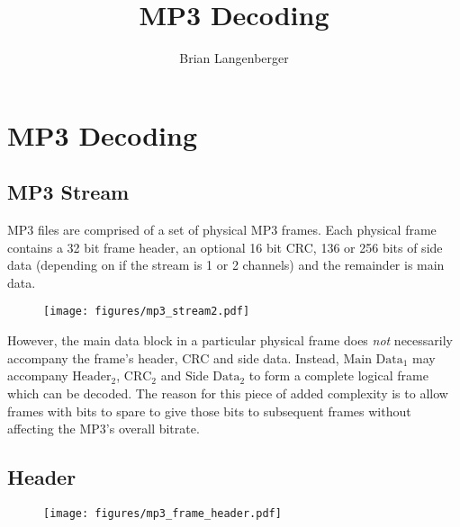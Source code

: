 \documentclass[letter]{scrbook}
\title{MP3 Decoding}
\author{Brian Langenberger}
\begin{document}
\maketitle
\tableofcontents
\chapter{MP3 Decoding}
\section{MP3 Stream}
MP3 files are comprised of a set of physical MP3 frames.
Each physical frame contains a 32 bit frame header,
an optional 16 bit CRC, 136 or 256 bits of side data
(depending on if the stream is 1 or 2 channels)
and the remainder is main data.

\begin{figure}[h]
\texttt{[image: figures/mp3\_stream2.pdf]}
\end{figure}

However, the main data block in a particular physical frame
does \textit{not} necessarily accompany the frame's header,
CRC and side data.
Instead, $\text{Main Data}_1$ may accompany
$\text{Header}_2$, $\text{CRC}_2$ and $\text{Side Data}_2$
to form a complete logical frame which can be decoded.
The reason for this piece of added complexity is to allow
frames with bits to spare to give those bits to subsequent frames
without affecting the MP3's overall bitrate.

\clearpage

\section{Header}
\begin{figure}[h]
\texttt{[image: figures/mp3\_frame\_header.pdf]}
\end{figure}
\end{document}
